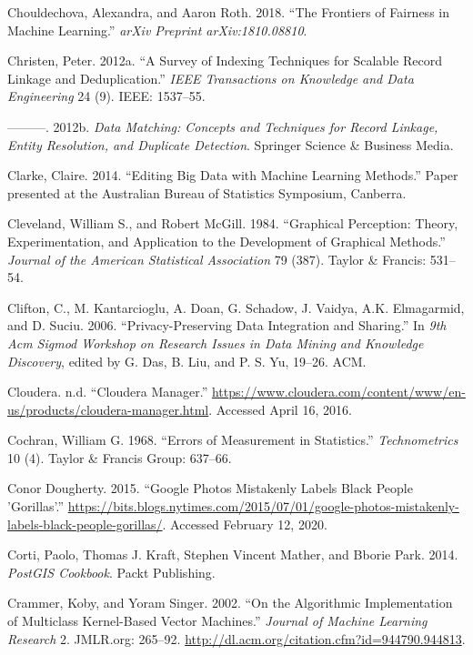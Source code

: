 \documentclass[]{krantz}
\begin{document}
\hypertarget{ref-chouldechova2018}{}
Chouldechova, Alexandra, and Aaron Roth. 2018. ``The Frontiers of
Fairness in Machine Learning.'' \emph{arXiv Preprint arXiv:1810.08810}.

\hypertarget{ref-christen2012survey}{}
Christen, Peter. 2012a. ``A Survey of Indexing Techniques for Scalable
Record Linkage and Deduplication.'' \emph{IEEE Transactions on Knowledge
and Data Engineering} 24 (9). IEEE: 1537--55.

\hypertarget{ref-christen2012data}{}
---------. 2012b. \emph{Data Matching: Concepts and Techniques for
Record Linkage, Entity Resolution, and Duplicate Detection}. Springer
Science \& Business Media.

\hypertarget{ref-Clarke2014}{}
Clarke, Claire. 2014. ``Editing Big Data with Machine Learning
Methods.'' Paper presented at the Australian Bureau of Statistics
Symposium, Canberra.

\hypertarget{ref-cleveland1984graphical}{}
Cleveland, William S., and Robert McGill. 1984. ``Graphical Perception:
Theory, Experimentation, and Application to the Development of Graphical
Methods.'' \emph{Journal of the American Statistical Association} 79
(387). Taylor \& Francis: 531--54.

\hypertarget{ref-Clifton06}{}
Clifton, C., M. Kantarcioglu, A. Doan, G. Schadow, J. Vaidya, A.K.
Elmagarmid, and D. Suciu. 2006. ``Privacy-Preserving Data Integration
and Sharing.'' In \emph{9th Acm Sigmod Workshop on Research Issues in
Data Mining and Knowledge Discovery}, edited by G. Das, B. Liu, and P.
S. Yu, 19--26. ACM.

\hypertarget{ref-ClouderaManager}{}
Cloudera. n.d. ``Cloudera Manager.''
\url{https://www.cloudera.com/content/www/en-us/products/cloudera-manager.html}.
Accessed April 16, 2016.

\hypertarget{ref-cochran1968errors}{}
Cochran, William G. 1968. ``Errors of Measurement in Statistics.''
\emph{Technometrics} 10 (4). Taylor \& Francis Group: 637--66.

\hypertarget{ref-dougherty2015}{}
Conor Dougherty. 2015. ``Google Photos Mistakenly Labels Black People
'Gorillas'.''
\url{https://bits.blogs.nytimes.com/2015/07/01/google-photos-mistakenly-labels-black-people-gorillas/}.
Accessed February 12, 2020.

\hypertarget{ref-PostGISCookbook}{}
Corti, Paolo, Thomas J. Kraft, Stephen Vincent Mather, and Bborie Park.
2014. \emph{PostGIS Cookbook}. Packt Publishing.

\hypertarget{ref-crammer2002}{}
Crammer, Koby, and Yoram Singer. 2002. ``On the Algorithmic
Implementation of Multiclass Kernel-Based Vector Machines.''
\emph{Journal of Machine Learning Research} 2. JMLR.org: 265--92.
\url{http://dl.acm.org/citation.cfm?id=944790.944813}.
\end{document}
